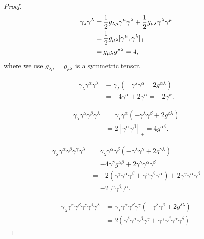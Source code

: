 \documentclass[10pt]{article}
\begin{document}
\begin{proof}
	\begin{align*}
		\gamma_{\lambda} \gamma^{\lambda} &= \frac{1}{2} g_{\lambda \mu} \gamma^{\mu} \gamma^{\lambda} + \frac{1}{2} g_{\mu \lambda} \gamma^{\lambda} \gamma^{\mu} \\
		&= \frac{1}{2} g_{\mu \lambda} [\gamma^{\mu}, \gamma^{\lambda}]_+ \\
		&= g_{\mu \lambda} g^{\mu \lambda} = 4,
	\end{align*}
	where we use $g_{\lambda \mu} = g_{\mu \lambda}$ is a symmetric tensor.

	\begin{align*}
		\gamma_{\lambda} \gamma^{\alpha} \gamma^{\lambda} &= \gamma_{\lambda} (- \gamma^{\lambda} \gamma^{\alpha} + 2g^{\alpha \lambda}) \\
		&= -4 \gamma^{\alpha} + 2 \gamma^{\alpha} = -2 \gamma^{\alpha}.
	\end{align*}

	\begin{align*}
		\gamma_{\lambda} \gamma^{\alpha} \gamma^{\beta} \gamma^{\lambda} &= \gamma_{\lambda} \gamma^{\alpha} (-\gamma^{\lambda} \gamma^{\beta} + 2g^{\beta \lambda}) \\
		&= 2[\gamma^{\alpha} \gamma^{\beta}]_+ = 4g^{\alpha \beta}.
	\end{align*}

	\begin{align*}
		\gamma_{\lambda} \gamma^{\alpha} \gamma^{\beta} \gamma^{\gamma} \gamma^{\lambda} &= \gamma_{\lambda} \gamma^{\alpha} \gamma^{\beta} (-\gamma^{\lambda} \gamma^{\gamma} + 2g^{\gamma \lambda})\\
		&= -4 \gamma^{\gamma} g^{\alpha \beta} + 2 \gamma^{\gamma} \gamma^{\alpha} \gamma^{\beta}\\
		&= -2 (\gamma^{\gamma} \gamma^{\alpha} \gamma^{\beta} + \gamma^{\gamma} \gamma^{\beta} \gamma^{\alpha}) + 2 \gamma^{\gamma} \gamma^{\alpha} \gamma^{\beta}\\
		&= -2 \gamma^{\gamma} \gamma^{\beta} \gamma^{\alpha}.
	\end{align*}

	\begin{align*}
		\gamma_{\lambda} \gamma^{\alpha} \gamma^{\beta} \gamma^{\gamma} \gamma^{\delta} \gamma^{\lambda} &= \gamma_{\lambda} \gamma^{\alpha} \gamma^{\beta} \gamma^{\gamma} (-\gamma^{\lambda} \gamma^{\delta} + 2g^{\delta \lambda})\\
		&= 2(\gamma^{\delta} \gamma^{\alpha} \gamma^{\beta} \gamma^{\gamma} + \gamma^{\gamma} \gamma^{\beta} \gamma^{\alpha} \gamma^{\delta}).
	\end{align*}
\end{proof}
\end{document}
